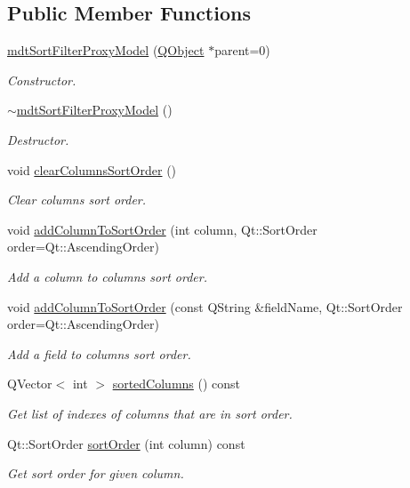 \subsection*{Public Member Functions}
\begin{DoxyCompactItemize}
\item 
\hyperlink{classmdt_sort_filter_proxy_model_a83bcd157f655c4d675e5a30d97fa16ba}{mdt\-Sort\-Filter\-Proxy\-Model} (\hyperlink{class_q_object}{Q\-Object} $\ast$parent=0)
\begin{DoxyCompactList}\small\item\em Constructor. \end{DoxyCompactList}\item 
\hyperlink{classmdt_sort_filter_proxy_model_a5d1c4647657a13d4b225e790a6b8d1a3}{$\sim$mdt\-Sort\-Filter\-Proxy\-Model} ()
\begin{DoxyCompactList}\small\item\em Destructor. \end{DoxyCompactList}\item 
void \hyperlink{classmdt_sort_filter_proxy_model_aad45b85d23fe3c2eb6198a9eece685d2}{clear\-Columns\-Sort\-Order} ()
\begin{DoxyCompactList}\small\item\em Clear columns sort order. \end{DoxyCompactList}\item 
void \hyperlink{classmdt_sort_filter_proxy_model_a22d0f84ebcc9af078f3c004dbe790fe8}{add\-Column\-To\-Sort\-Order} (int column, Qt\-::\-Sort\-Order order=Qt\-::\-Ascending\-Order)
\begin{DoxyCompactList}\small\item\em Add a column to columns sort order. \end{DoxyCompactList}\item 
void \hyperlink{classmdt_sort_filter_proxy_model_ae447c8f1449b1314fac2448c8b004885}{add\-Column\-To\-Sort\-Order} (const Q\-String \&field\-Name, Qt\-::\-Sort\-Order order=Qt\-::\-Ascending\-Order)
\begin{DoxyCompactList}\small\item\em Add a field to columns sort order. \end{DoxyCompactList}\item 
Q\-Vector$<$ int $>$ \hyperlink{classmdt_sort_filter_proxy_model_a1a4d9fcee3a6817ae668c07ca2ec472f}{sorted\-Columns} () const 
\begin{DoxyCompactList}\small\item\em Get list of indexes of columns that are in sort order. \end{DoxyCompactList}\item 
Qt\-::\-Sort\-Order \hyperlink{classmdt_sort_filter_proxy_model_a506fff2a1f483ff67989c64b2c4e3491}{sort\-Order} (int column) const 
\begin{DoxyCompactList}\small\item\em Get sort order for given column. \end{DoxyCompactList}\end{DoxyCompactItemize}


